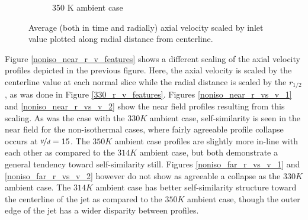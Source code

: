 \begin{figure}[H]
\begin{center}
\begin{subfigure}{0.45\textwidth}
	\caption{350 K ambient case} \label{noniso_v_vin_r_d_2}
\end{subfigure}
\caption{Average (both in time and radially) axial velocity scaled by inlet value plotted along radial distance from centerline.}
\label{noniso_v_vin_r_d_features}
\end{center}
\end{figure}
Figure \ref{noniso_near_r_v_features} shows a different scaling of the axial velocity profiles depicted in the previous figure. Here, the axial velocity is scaled by the centerline value at each normal slice while the radial distance is scaled by the $r_{1/2}$, as was done in Figure \ref{330_r_v_features}. Figures \ref{noniso_near_r_vs_v_1} and \ref{noniso_near_r_vs_v_2} show the near field profiles resulting from this scaling. As was the case with the $330 K $ ambient case, self-similarity is seen in the near field for the non-isothermal cases, where fairly agreeable profile collapse occurs at $\nicefrac{y}{d} = 15$. The $350 K$ ambient case profiles are slightly more in-line with each other as compared to the $314 K$ ambient case, but both demonstrate a general tendency toward self-similarity still. Figures \ref{noniso_far_r_vs_v_1} and \ref{noniso_far_r_vs_v_2} however do not show as agreeable a collapse as the $330 K$ ambient case. The $314 K$ ambient case has better self-similarity structure toward the centerline of the jet as compared to the $350 K$ ambient case, though the outer edge of the jet has a wider disparity between profiles. 
